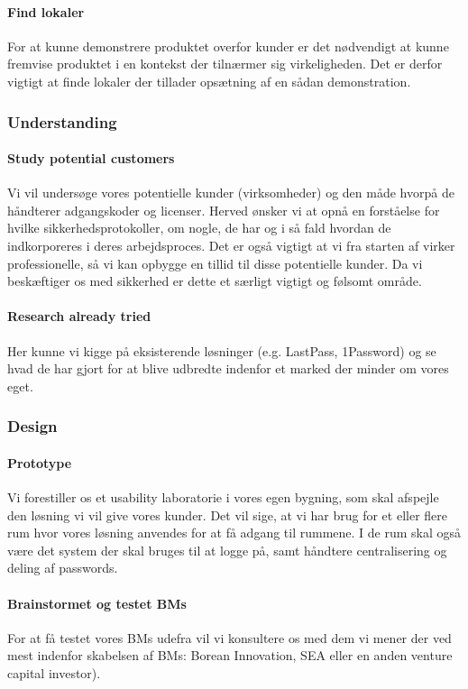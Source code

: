 \paragraph{Find lokaler}
For at kunne demonstrere produktet overfor kunder er det nødvendigt at kunne fremvise produktet i en kontekst der tilnærmer sig virkeligheden.
Det er derfor vigtigt at finde lokaler der tillader opsætning af en sådan demonstration.

\subsubsection{Understanding}
\paragraph{Study potential customers}
Vi vil undersøge vores potentielle kunder (virksomheder) og den måde hvorpå de håndterer adgangskoder og licenser.
Herved ønsker vi at opnå en forståelse for hvilke sikkerhedsprotokoller, om nogle, de har og i så fald hvordan de indkorporeres i deres arbejdsproces.
Det er også vigtigt at vi fra starten af virker professionelle, så vi kan opbygge en tillid til disse potentielle kunder.
Da vi beskæftiger os med sikkerhed er dette et særligt vigtigt og følsomt område.

\paragraph{Research already tried}
Her kunne vi kigge på eksisterende løsninger (e.g. LastPass, 1Password) og se hvad de har gjort for at blive udbredte indenfor et marked der minder om vores eget.

\subsubsection{Design}
\paragraph{Prototype}
Vi forestiller os et usability laboratorie i vores egen bygning, som skal afspejle den løsning vi vil give vores kunder.
Det vil sige, at vi har brug for et eller flere rum hvor vores løsning anvendes for at få adgang til rummene.
I de rum skal også være det system der skal bruges til at logge på, samt håndtere centralisering og deling af passwords.

\paragraph{Brainstormet og testet BMs}
For at få testet vores BMs udefra vil vi konsultere os med dem vi mener der ved mest indenfor skabelsen af BMs: Borean Innovation, SEA eller en anden venture capital investor).
